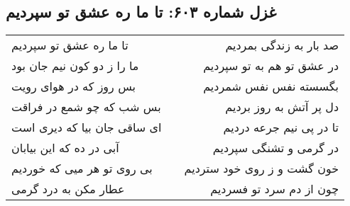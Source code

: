 \begin{center}
\section*{غزل شماره ۶۰۳: تا ما ره عشق تو سپردیم}
\label{sec:603}
\begin{longtable}{l p{0.5cm} r}
تا ما ره عشق تو سپردیم
&&
صد بار به زندگی بمردیم
\\
ما را ز دو کون نیم جان بود
&&
در عشق تو هم به تو سپردیم
\\
بس روز که در هوای رویت
&&
بگسسته نفس نفس شمردیم
\\
بس شب که چو شمع در فراقت
&&
دل پر آتش به روز بردیم
\\
ای ساقی جان بیا که دیری است
&&
تا در پی نیم جرعه دردیم
\\
آبی در ده که این بیابان
&&
در گرمی و تشنگی سپردیم
\\
بی روی تو هر میی که خوردیم
&&
خون گشت و ز روی خود ستردیم
\\
عطار مکن به درد گرمی
&&
چون از دم سرد تو فسردیم
\\
\end{longtable}
\end{center}
